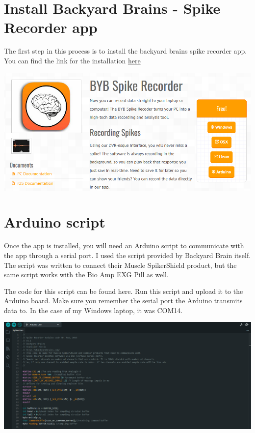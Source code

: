 \documentclass[
  letterpaper,
  DIV=11,
  numbers=noendperiod]{scrreprt}
\begin{document}
\section{Install Backyard Brains - Spike Recorder
app}\label{install-backyard-brains---spike-recorder-app}

The first step in this process is to install the backyard brains spike
recorder app. You can find the link for the installation
\href{https://backyardbrains.com/products/spikerecorder}{here}

\begin{center}
\includegraphics{images/clipboard-1284036578.png}
\end{center}

\section{Arduino script}\label{arduino-script}

Once the app is installed, you will need an Arduino script to
communicate with the app through a serial port. I used the script
provided by Backyard Brain itself. The script was written to connect
their Muscle SpikerShield product, but the same script works with the
Bio Amp EXG Pill as well.

The code for this script can be found here. Run this script and upload
it to the Arduino board. Make sure you remember the serial port the
Arduino transmits data to. In the case of my Windows laptop, it was
COM14.

\includegraphics{images/clipboard-2071281161.png}
\end{document}
